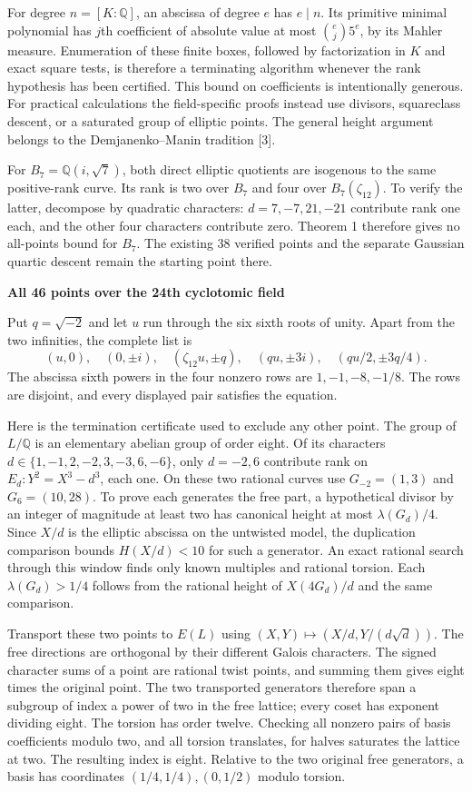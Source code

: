 \documentclass[12pt]{article}
\newcommand{\Q}{\mathbb Q}\newcommand{\Z}{\mathbb Z}\newcommand{\C}{C_6}
\newcommand{\heading}[1]{{\Large\bfseries\color{ink}#1}\par\smallskip}
\newcommand{\subh}[1]{\par\smallskip{\bfseries\color{teal}#1}\par}
\begin{document}
For degree $n=[K:\Q]$, an abscissa of degree $e$ has $e\mid n$. Its primitive minimal polynomial has $j$th coefficient of absolute value at most $\binom ej 5^e$, by its Mahler measure. Enumeration of these finite boxes, followed by factorization in $K$ and exact square tests, is therefore a terminating algorithm whenever the rank hypothesis has been certified. This bound on coefficients is intentionally generous. For practical calculations the field-specific proofs instead use divisors, squareclass descent, or a saturated group of elliptic points. The general height argument belongs to the Demjanenko--Manin tradition [3].

\subh{Why the adjacent biquadratic field remains distinct}
For $B_7=\Q(i,\sqrt7)$, both direct elliptic quotients are isogenous to the same positive-rank curve. Its rank is two over $B_7$ and four over $B_7(\zeta_{12})$. To verify the latter, decompose by quadratic characters: $d=7,-7,21,-21$ contribute rank one each, and the other four characters contribute zero. Theorem 1 therefore gives no all-points bound for $B_7$. The existing 38 verified points and the separate Gaussian quartic descent remain the starting point there.

\newpage
\heading{All 46 points over the 24th cyclotomic field}
Put $q=\sqrt{-2}$ and let $u$ run through the six sixth roots of unity. Apart from the two infinities, the complete list is
\[
 (u,0),\quad (0,\pm i),\quad
 (\zeta_{12}u,\pm q),\quad (qu,\pm3i),\quad
 (qu/2,\pm3q/4).
\]
The abscissa sixth powers in the four nonzero rows are $1,-1,-8,-1/8$. The rows are disjoint, and every displayed pair satisfies the equation.

Here is the termination certificate used to exclude any other point. The group of $L/\Q$ is an elementary abelian group of order eight. Of its characters $d\in\{1,-1,2,-2,3,-3,6,-6\}$, only $d=-2,6$ contribute rank on $E_d:Y^2=X^3-d^3$, each one. On these two rational curves use $G_{-2}=(1,3)$ and $G_6=(10,28)$. To prove each generates the free part, a hypothetical divisor by an integer of magnitude at least two has canonical height at most $\lambda(G_d)/4$. Since $X/d$ is the elliptic abscissa on the untwisted model, the duplication comparison bounds $H(X/d)<10$ for such a generator. An exact rational search through this window finds only known multiples and rational torsion. Each $\lambda(G_d)>1/4$ follows from the rational height of $X(4G_d)/d$ and the same comparison.

Transport these two points to $E(L)$ using $(X,Y)\mapsto(X/d,Y/(d\sqrt d))$. The free directions are orthogonal by their different Galois characters. The signed character sums of a point are rational twist points, and summing them gives eight times the original point. The two transported generators therefore span a subgroup of index a power of two in the free lattice; every coset has exponent dividing eight. The torsion has order twelve. Checking all nonzero pairs of basis coefficients modulo two, and all torsion translates, for halves saturates the lattice at two. The resulting index is eight. Relative to the two original free generators, a basis has coordinates $(1/4,1/4),(0,1/2)$ modulo torsion.
\end{document}

